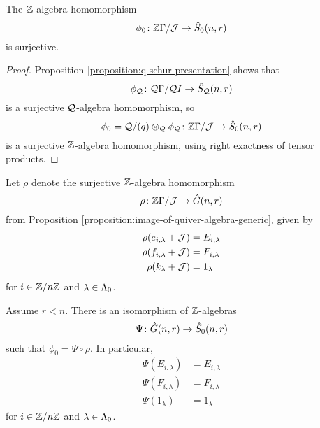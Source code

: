 \documentclass[a4paper, 11pt, twoside]{report}
\begin{document}
\begin{lemma}\label{lemma:quiver-onto-zero-schur}
The $\mathbb{Z}$-algebra homomorphism
\begin{equation*}
\phi_0\colon\mathbb{Z}\Gamma/{\mathcal{J}}\to\hat{S}_0(n,r)
\end{equation*}
is surjective.
\end{lemma}

\begin{proof}
Proposition \ref{proposition:q-schur-presentation} shows that
\begin{equation*}
\phi_{\mathcal{Q}}\colon \mathcal{Q}\Gamma/{\mathcal{Q}I}\to\hat{S}_{\mathcal{Q}}(n,r)
\end{equation*}
is a surjective $\mathcal{Q}$-algebra homomorphism, so
\begin{equation*}
\phi_0 = \mathcal{Q}/{(q)}\otimes_{\mathcal{Q}}\phi_{\mathcal{Q}} \colon \mathbb{Z}\Gamma/{\mathcal{J}}\to\hat{S}_0(n,r)
\end{equation*}
is a surjective $\mathbb{Z}$-algebra homomorphism, using right exactness of tensor products.
\end{proof}

Let $\rho$ denote the surjective $\mathbb{Z}$-algebra homomorphism
\begin{equation*}
\rho\colon \mathbb{Z}\Gamma/{\mathcal{J}}\to\hat{G}(n,r)
\end{equation*}
from Proposition \ref{proposition:image-of-quiver-algebra-generic}, given by
\begin{align*}
\rho(e_{i,\lambda} +\mathcal{J}) &= E_{i,\lambda}\\
\rho(f_{i,\lambda} +\mathcal{J}) &= F_{i,\lambda}\\
\rho(k_\lambda +\mathcal{J}) &= 1_\lambda
\end{align*}
for $i\in\mathbb{Z}/{n \mathbb{Z}}$ and $\lambda\in\Lambda_0{}$.

\begin{conjecture}\label{conjecture:generic-to-zero-schur}
Assume $r<n$. There is an isomorphism of $\mathbb{Z}$-algebras
\begin{equation*}
\Psi\colon\hat{G}(n,r)\to\hat{S}_0(n,r)
\end{equation*}
such that $\phi_0 = \Psi\circ\rho$. In particular,
\begin{align*}
\Psi(E_{i,\lambda}) &= E_{i,\lambda}\\
\Psi(F_{i,\lambda}) &= F_{i,\lambda}\\
\Psi(1_\lambda) &= 1_\lambda
\end{align*}
for $i\in\mathbb{Z}/{n \mathbb{Z}}$ and $\lambda\in\Lambda_0{}$.
\end{conjecture}
\end{document}
